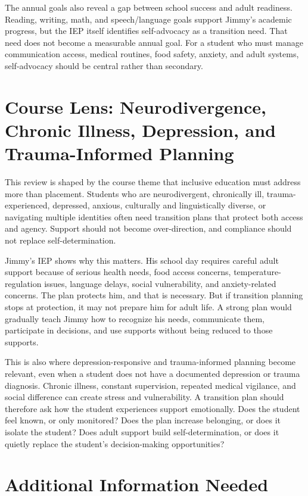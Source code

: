The annual goals also reveal a gap between school success and adult readiness. Reading, writing, math, and speech/language goals support Jimmy's academic progress, but the IEP itself identifies self-advocacy as a transition need. That need does not become a measurable annual goal. For a student who must manage communication access, medical routines, food safety, anxiety, and adult systems, self-advocacy should be central rather than secondary.

\section*{Course Lens: Neurodivergence, Chronic Illness, Depression, and Trauma-Informed Planning}

This review is shaped by the course theme that inclusive education must address more than placement. Students who are neurodivergent, chronically ill, trauma-experienced, depressed, anxious, culturally and linguistically diverse, or navigating multiple identities often need transition plans that protect both access and agency. Support should not become over-direction, and compliance should not replace self-determination.

Jimmy's IEP shows why this matters. His school day requires careful adult support because of serious health needs, food access concerns, temperature-regulation issues, language delays, social vulnerability, and anxiety-related concerns. The plan protects him, and that is necessary. But if transition planning stops at protection, it may not prepare him for adult life. A strong plan would gradually teach Jimmy how to recognize his needs, communicate them, participate in decisions, and use supports without being reduced to those supports.

This is also where depression-responsive and trauma-informed planning become relevant, even when a student does not have a documented depression or trauma diagnosis. Chronic illness, constant supervision, repeated medical vigilance, and social difference can create stress and vulnerability. A transition plan should therefore ask how the student experiences support emotionally. Does the student feel known, or only monitored? Does the plan increase belonging, or does it isolate the student? Does adult support build self-determination, or does it quietly replace the student's decision-making opportunities?

\section*{Additional Information Needed}


